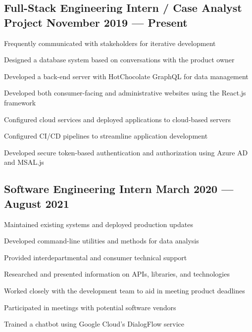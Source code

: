 \subsection{{Full-Stack Engineering Intern / Case Analyst Project \hfill November 2019 --- Present}}
\begin{zitemize}
\item Frequently communicated with stakeholders for iterative development
\item Designed a database system based on conversations with the product owner
\item Developed a back-end server with HotChocolate GraphQL for data management
\item Developed both consumer-facing and administrative websites using the React.js framework
\item Configured cloud services and deployed applications to cloud-based servers
\item Configured CI/CD pipelines to streamline application development
\item Developed secure token-based authentication and authorization using Azure AD and MSAL.js

\end{zitemize}

\subsection{{Software Engineering Intern \hfill March 2020 --- August 2021}}
\begin{zitemize}
\item Maintained existing systems and deployed production updates
\item Developed command-line utilities and methods for data analysis
\item Provided interdepartmental and consumer technical support
\item Researched and presented information on APIs, libraries, and technologies
\item Worked closely with the development team to aid in meeting product deadlines
\item Participated in meetings with potential software vendors
\item Trained a chatbot using Google Cloud's DialogFlow service
\end{zitemize}

